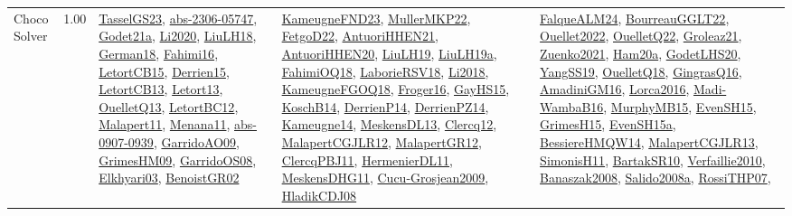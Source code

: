 {\begin{longtable}{p{3cm}r>{\raggedright\arraybackslash}p{6cm}>{\raggedright\arraybackslash}p{6cm}>{\raggedright\arraybackslash}p{8cm}}
\index{Choco Solver}\index{CPSystems!Choco Solver}Choco Solver &  1.00 & \hyperref[detail:TasselGS23]{TasselGS23}, \hyperref[detail:abs-2306-05747]{abs-2306-05747}, \hyperref[detail:Godet21a]{Godet21a}, \hyperref[detail:Li2020]{Li2020}, \hyperref[detail:LiuLH18]{LiuLH18}, \hyperref[detail:German18]{German18}, \hyperref[detail:Fahimi16]{Fahimi16}, \hyperref[detail:LetortCB15]{LetortCB15}, \hyperref[detail:Derrien15]{Derrien15}, \hyperref[detail:LetortCB13]{LetortCB13}, \hyperref[detail:Letort13]{Letort13}, \hyperref[detail:OuelletQ13]{OuelletQ13}, \hyperref[detail:LetortBC12]{LetortBC12}, \hyperref[detail:Malapert11]{Malapert11}, \hyperref[detail:Menana11]{Menana11}, \hyperref[detail:abs-0907-0939]{abs-0907-0939}, \hyperref[detail:GarridoAO09]{GarridoAO09}, \hyperref[detail:GrimesHM09]{GrimesHM09}, \hyperref[detail:GarridoOS08]{GarridoOS08}, \hyperref[detail:Elkhyari03]{Elkhyari03}, \hyperref[detail:BenoistGR02]{BenoistGR02} & \hyperref[detail:KameugneFND23]{KameugneFND23}, \hyperref[detail:MullerMKP22]{MullerMKP22}, \hyperref[detail:FetgoD22]{FetgoD22}, \hyperref[detail:AntuoriHHEN21]{AntuoriHHEN21}, \hyperref[detail:AntuoriHHEN20]{AntuoriHHEN20}, \hyperref[detail:LiuLH19]{LiuLH19}, \hyperref[detail:LiuLH19a]{LiuLH19a}, \hyperref[detail:FahimiOQ18]{FahimiOQ18}, \hyperref[detail:LaborieRSV18]{LaborieRSV18}, \hyperref[detail:Li2018]{Li2018}, \hyperref[detail:KameugneFGOQ18]{KameugneFGOQ18}, \hyperref[detail:Froger16]{Froger16}, \hyperref[detail:GayHS15]{GayHS15}, \hyperref[detail:KoschB14]{KoschB14}, \hyperref[detail:DerrienP14]{DerrienP14}, \hyperref[detail:DerrienPZ14]{DerrienPZ14}, \hyperref[detail:Kameugne14]{Kameugne14}, \hyperref[detail:MeskensDL13]{MeskensDL13}, \hyperref[detail:Clercq12]{Clercq12}, \hyperref[detail:MalapertCGJLR12]{MalapertCGJLR12}, \hyperref[detail:MalapertGR12]{MalapertGR12}, \hyperref[detail:ClercqPBJ11]{ClercqPBJ11}, \hyperref[detail:HermenierDL11]{HermenierDL11}, \hyperref[detail:MeskensDHG11]{MeskensDHG11}, \hyperref[detail:Cucu-Grosjean2009]{Cucu-Grosjean2009}, \hyperref[detail:HladikCDJ08]{HladikCDJ08} & \hyperref[detail:FalqueALM24]{FalqueALM24}, \hyperref[detail:BourreauGGLT22]{BourreauGGLT22}, \hyperref[detail:Ouellet2022]{Ouellet2022}, \hyperref[detail:OuelletQ22]{OuelletQ22}, \hyperref[detail:Groleaz21]{Groleaz21}, \hyperref[detail:Zuenko2021]{Zuenko2021}, \hyperref[detail:Ham20a]{Ham20a}, \hyperref[detail:GodetLHS20]{GodetLHS20}, \hyperref[detail:YangSS19]{YangSS19}, \hyperref[detail:OuelletQ18]{OuelletQ18}, \hyperref[detail:GingrasQ16]{GingrasQ16}, \hyperref[detail:AmadiniGM16]{AmadiniGM16}, \hyperref[detail:Lorca2016]{Lorca2016}, \hyperref[detail:Madi-WambaB16]{Madi-WambaB16}, \hyperref[detail:MurphyMB15]{MurphyMB15}, \hyperref[detail:EvenSH15]{EvenSH15}, \hyperref[detail:GrimesH15]{GrimesH15}, \hyperref[detail:EvenSH15a]{EvenSH15a}, \hyperref[detail:BessiereHMQW14]{BessiereHMQW14}, \hyperref[detail:MalapertCGJLR13]{MalapertCGJLR13}, \hyperref[detail:SimonisH11]{SimonisH11}, \hyperref[detail:BartakSR10]{BartakSR10}, \hyperref[detail:Verfaillie2010]{Verfaillie2010}, \hyperref[detail:Banaszak2008]{Banaszak2008}, \hyperref[detail:Salido2008a]{Salido2008a}, \hyperref[detail:RossiTHP07]{RossiTHP07}, 
\end{longtable}}
